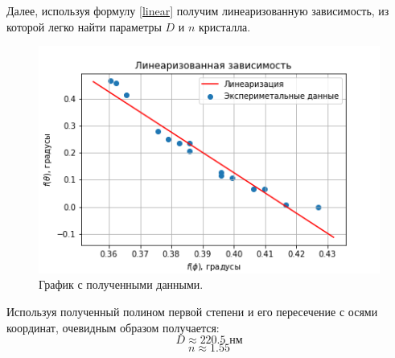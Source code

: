 \documentclass[a4paper, 12pt]{article}
\begin{document}
	Далее, используя формулу \ref{linear} получим линеаризованную зависимость, из которой легко найти параметры $D$ и $n$ кристалла.
	\begin{figure}[H]
		\centering
		\includegraphics[width=0.75\linewidth]{Graph2.png}
		\caption{График с полученными данными.}
		\label{fig:5}
	\end{figure}
 Используя полученный полином первой степени и его пересечение с осями координат, очевидным образом получается:
	\begin{equation*}
 		D  \approx 220.5 \text{ нм}
	\end{equation*}
	\begin{equation*}
		n  \approx 1.55
	\end{equation*}
\end{document}
